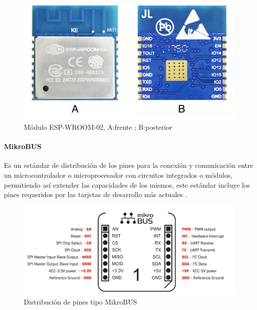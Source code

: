 \paragraph{}

\begin{figure}[H]
	\centering
	\includegraphics[scale=.2]{Capitulo2/images/wroom.png}
	\caption{Módulo ESP-WROOM-02, A:frente ; B:posterior}
	\label{fig:diagrama_dispensador}
\end{figure}


\paragraph{MikroBUS}
Es un estándar de distribución de los pines para la conexión y comunicación entre un microcontrolador o microprocesador con circuitos integrados o módulos, permitiendo así extender las capacidades de los mismos, este estándar incluye los pines requeridos por las tarjetas de desarrollo más actuales \citep{MarcoTeorico5}.
\begin{figure}[H]
	\centering
	\includegraphics[scale=.25]{Capitulo2/images/mikrobus.png}
	\caption{Distribución de pines tipo MikroBUS}
	\label{fig:diagrama_dispensador}
\end{figure}
\paragraph{}

